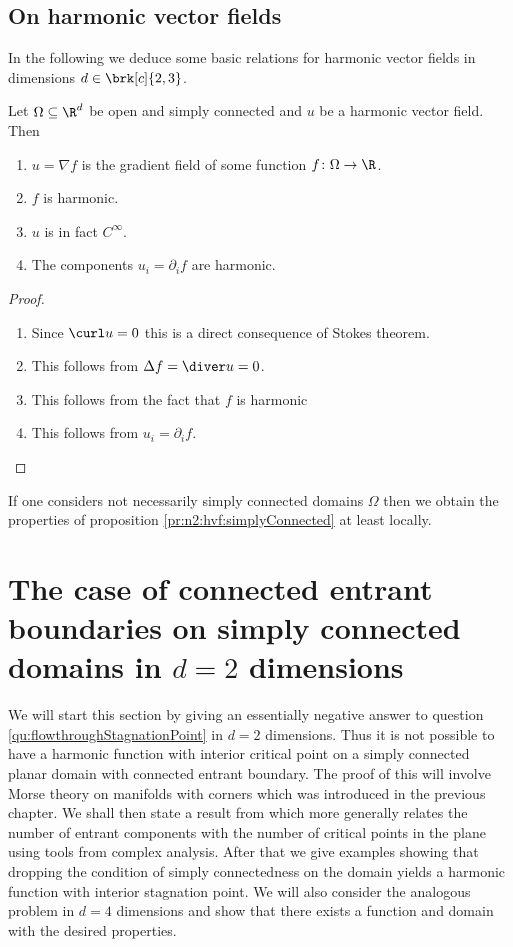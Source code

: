 \section{On harmonic vector fields}

In the following we deduce some basic relations for harmonic vector fields in dimensions $d\in\brk[c]{2,3}$.
\begin{proposition}\label{pr:n2:hvf:simplyConnected}
  Let $\Omega\subseteq\R^d$ be open and simply connected and $u$ be a harmonic vector field. Then
  \begin{enumerate}
    \item 
    $u=\nabla f$ is the gradient field of some
    function $f\colon\Omega\to\R$.
    \item  $f$ is harmonic.
    \item $u$ is in fact $C^\infty$.
    \item The components $u_i=\partial_if$ are harmonic.
  \end{enumerate}
\end{proposition}
\begin{proof}
  \begin{enumerate}
    \item 
    Since $\curl u =0$ this is a direct consequence of Stokes theorem.
    \item This follows from $\Delta f = \diver u=0$.
    \item This follows from the fact that $f$ is harmonic
    \item This follows from $u_i=\partial_if$.
  \end{enumerate}
\end{proof}

If one considers not necessarily simply connected domains $\Omega$ then we obtain the
properties of proposition \ref{pr:n2:hvf:simplyConnected} at least locally.

\chapter{The case of connected entrant boundaries
on simply connected domains in $d=2$ dimensions}

We will start this section by giving an essentially negative answer to question \ref{qu:flowthroughStagnationPoint}
in $d=2$ dimensions. Thus it is not possible to have a harmonic function with interior critical point on a simply connected
planar domain with connected entrant boundary. The proof of this will involve Morse theory on manifolds with corners which was
introduced in the previous chapter.
We shall then state a result from \cite{Alessandrini1992} which more generally relates the number of entrant components with the number
of critical points in the plane using tools from complex analysis. 
After that we give examples showing that dropping the condition of simply connectedness on the domain yields
a harmonic function with interior stagnation point. 
We will also consider the analogous problem in $d=4$ dimensions and show that there exists a function and domain with the
desired properties.

